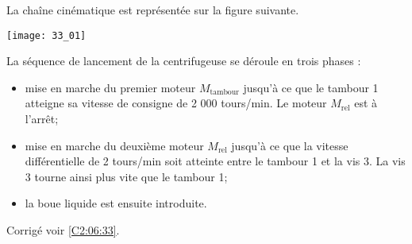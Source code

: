 \normaltrue \difficilefalse \tdifficilefalse
\correctiontrue


\setcounter{question}{0}

\ifcorrection
\else
{}
\fi

\ifprof
\else

La chaîne cinématique est représentée sur la figure
suivante.
\begin{center}
\texttt{[image: 33\_01]}
\end{center}


La séquence de lancement de la centrifugeuse se déroule en trois phases :
\begin{itemize}
\item mise en marche du premier moteur $M_{\text{tambour}}$ jusqu’à ce que le tambour 1 atteigne sa vitesse
de consigne de 2 000 tours/min. Le moteur $M_{\text{rel}}$ est à l’arrêt;
\item mise en marche du deuxième moteur $M_{\text{rel}}$ jusqu’à ce que la vitesse différentielle de
2 tours/min soit atteinte entre le tambour 1 et la vis 3. La vis 3 tourne ainsi plus vite que le
tambour 1;
\item la boue liquide est ensuite introduite.
\end{itemize}
\fi


\ifprof
\else
\fi

\ifprof
\else
\begin{flushright}
\footnotesize{Corrigé  voir \ref{C2:06:33}.}
\end{flushright}%
\fi